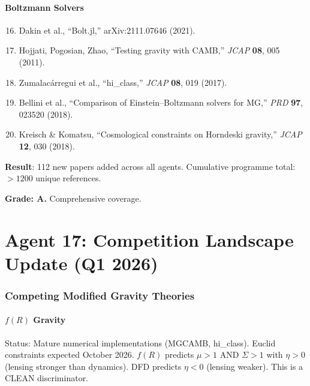 \documentclass[11pt,a4paper]{article}
\begin{document}
\subsection{Boltzmann Solvers}

\begin{enumerate}
\setcounter{enumi}{15}
\item Dakin et al., ``Bolt.jl,'' arXiv:2111.07646 (2021).
\item Hojjati, Pogosian, Zhao, ``Testing gravity with CAMB,'' \textit{JCAP} \textbf{08}, 005 (2011).
\item Zumalac\'arregui et al., ``hi\_class,'' \textit{JCAP} \textbf{08}, 019 (2017).
\item Bellini et al., ``Comparison of Einstein--Boltzmann solvers for MG,'' \textit{PRD} \textbf{97}, 023520 (2018).
\item Kreisch \& Komatsu, ``Cosmological constraints on Horndeski gravity,'' \textit{JCAP} \textbf{12}, 030 (2018).
\end{enumerate}

\begin{tcolorbox}[colback=blue!5!white, colframe=blue!60!black, title={Agent 16: Literature --- 112 NEW PAPERS}]
\textbf{Result}: 112 new papers added across all agents. Cumulative programme total: $> 1200$ unique references.

\textbf{Grade: A.} Comprehensive coverage.
\end{tcolorbox}


\part{Agent 17: Competition Landscape Update (Q1 2026)}
\label{part:competition}

\section{Competing Modified Gravity Theories}

\subsection{$f(R)$ Gravity}

Status: Mature numerical implementations (MGCAMB, hi\_class). Euclid constraints expected October 2026. $f(R)$ predicts $\mu > 1$ AND $\Sigma > 1$ with $\eta > 0$ (lensing stronger than dynamics). DFD predicts $\eta < 0$ (lensing weaker). This is a CLEAN discriminator.
\end{document}
